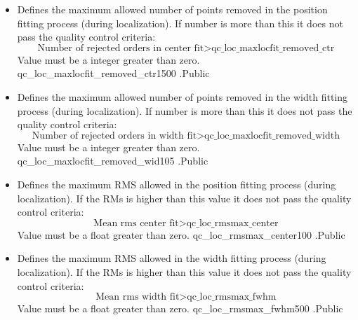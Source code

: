 \begin{itemize}
\item {} 
{Defines the maximum allowed number of points removed in the position fitting process (during localization). If number is more than this it does not pass the quality control criteria: 
\begin{equation}
\text{Number of rejected orders in center fit} >\text{qc\_loc\_maxlocfit\_removed\_ctr}
\end{equation}
Value must be a integer greater than zero.
}
{qc\_loc\_maxlocfit\_removed\_ctr}{1500}
{\callocRAW}{\constantsfile}{\callocRAW.\progMAIN}{Public}


\item {} 
{Defines the maximum allowed number of points removed in the width fitting process (during localization). If number is more than this it does not pass the quality control criteria: 
\begin{equation}
\text{Number of rejected orders in width fit} >\text{qc\_loc\_maxlocfit\_removed\_width}
\end{equation}
Value must be a integer greater than zero.
}
{qc\_loc\_maxlocfit\_removed\_wid}{105}
{\callocRAW}{\constantsfile}{\callocRAW.\progMAIN}{Public}


\item {} 
{Defines the maximum RMS allowed in the position fitting process (during localization). If the RMs is higher than this value it does not pass the quality control criteria: 
\begin{equation}
\text{Mean rms center fit} > \text{qc\_loc\_rmsmax\_center}
\end{equation}
Value must be a float greater than zero.
}
{qc\_loc\_rmsmax\_center}{100}
{\callocRAW}{\constantsfile}{\callocRAW.\progMAIN}{Public}


\item {} 
{Defines the maximum RMS allowed in the width fitting process (during localization). If the RMs is higher than this value it does not pass the quality control criteria: 
\begin{equation}
\text{Mean rms width fit} > \text{qc\_loc\_rmsmax\_fwhm}
\end{equation}
Value must be a float greater than zero.
}
{qc\_loc\_rmsmax\_fwhm}{500}
{\callocRAW}{\constantsfile}{\callocRAW.\progMAIN}{Public}


\end{itemize}
